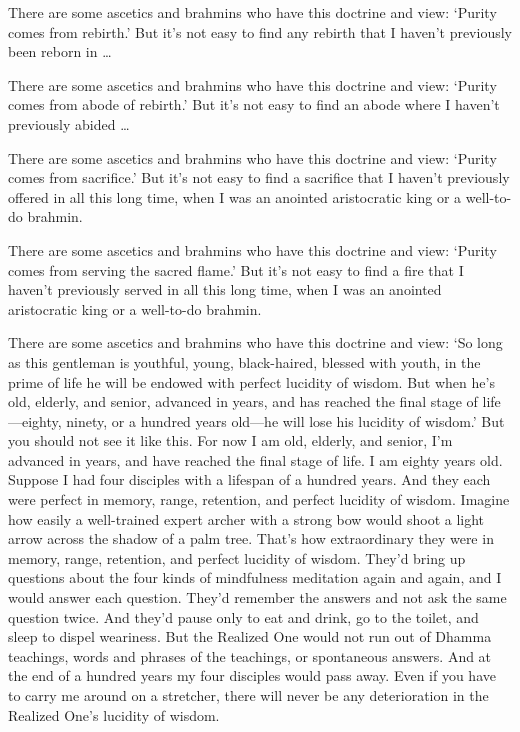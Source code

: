 \documentclass[12pt,openany]{book}%
\begin{document}
There are some ascetics and brahmins who have this doctrine and view: ‘Purity comes from rebirth.’ But it’s not easy to find any rebirth that I haven’t previously been reborn in … 

There are some ascetics and brahmins who have this doctrine and view: ‘Purity comes from abode of rebirth.’ But it’s not easy to find an abode where I haven’t previously abided … 

There are some ascetics and brahmins who have this doctrine and view: ‘Purity comes from sacrifice.’ But it’s not easy to find a sacrifice that I haven’t previously offered in all this long time, when I was an anointed aristocratic king or a well-to-do brahmin. 

There are some ascetics and brahmins who have this doctrine and view: ‘Purity comes from serving the sacred flame.’ But it’s not easy to find a fire that I haven’t previously served in all this long time, when I was an anointed aristocratic king or a well-to-do brahmin. 

There are some ascetics and brahmins who have this doctrine and view: ‘So long as this gentleman is youthful, young, black-haired, blessed with youth, in the prime of life he will be endowed with perfect lucidity of wisdom. But when he’s old, elderly, and senior, advanced in years, and has reached the final stage of life—eighty, ninety, or a hundred years old—he will lose his lucidity of wisdom.’ But you should not see it like this. For now I am old, elderly, and senior, I’m advanced in years, and have reached the final stage of life. I am eighty years old. Suppose I had four disciples with a lifespan of a hundred years. And they each were perfect in memory, range, retention, and perfect lucidity of wisdom. Imagine how easily a well-trained expert archer with a strong bow would shoot a light arrow across the shadow of a palm tree. That’s how extraordinary they were in memory, range, retention, and perfect lucidity of wisdom. They’d bring up questions about the four kinds of mindfulness meditation again and again, and I would answer each question. They’d remember the answers and not ask the same question twice. And they’d pause only to eat and drink, go to the toilet, and sleep to dispel weariness. But the Realized One would not run out of Dhamma teachings, words and phrases of the teachings, or spontaneous answers. And at the end of a hundred years my four disciples would pass away. Even if you have to carry me around on a stretcher, there will never be any deterioration in the Realized One’s lucidity of wisdom. 
\end{document}

